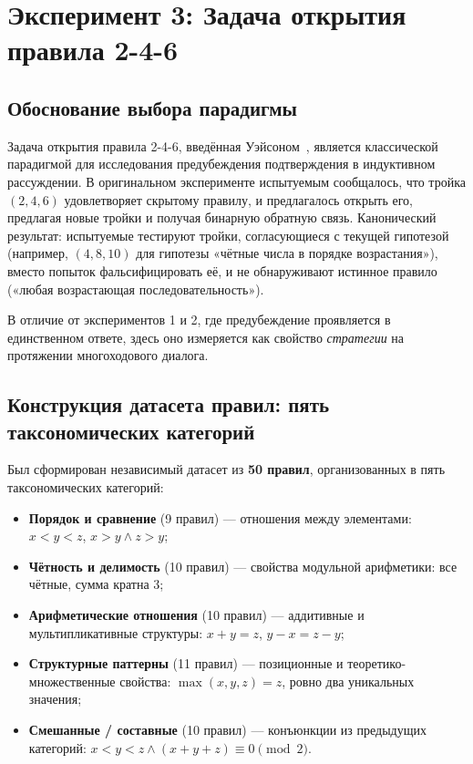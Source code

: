 \section{Эксперимент 3: Задача открытия правила 2-4-6}

\subsection{Обоснование выбора парадигмы}

Задача открытия правила 2-4-6, введённая Уэйсоном~\cite{wason1960failure}, является классической парадигмой для исследования предубеждения подтверждения в индуктивном рассуждении. В оригинальном эксперименте испытуемым сообщалось, что тройка $(2, 4, 6)$ удовлетворяет скрытому правилу, и предлагалось открыть его, предлагая новые тройки и получая бинарную обратную связь. Канонический результат: испытуемые тестируют тройки, согласующиеся с текущей гипотезой (например, $(4, 8, 10)$ для гипотезы «чётные числа в порядке возрастания»), вместо попыток фальсифицировать её, и не обнаруживают истинное правило («любая возрастающая последовательность»).

В отличие от экспериментов 1 и 2, где предубеждение проявляется в единственном ответе, здесь оно измеряется как свойство \textit{стратегии} на протяжении многоходового диалога.

\subsection{Конструкция датасета правил: пять таксономических категорий}

Был сформирован независимый датасет из \textbf{50 правил}, организованных в пять таксономических категорий:

\begin{itemize}
  \item \textbf{Порядок и сравнение} (9 правил) --- отношения между элементами: $x < y < z$, $x > y \land z > y$;
  \item \textbf{Чётность и делимость} (10 правил) --- свойства модульной арифметики: все чётные, сумма кратна 3;
  \item \textbf{Арифметические отношения} (10 правил) --- аддитивные и мультипликативные структуры: $x + y = z$, $y - x = z - y$;
  \item \textbf{Структурные паттерны} (11 правил) --- позиционные и теоретико-множественные свойства: $\max(x, y, z) = z$, ровно два уникальных значения;
  \item \textbf{Смешанные / составные} (10 правил) --- конъюнкции из предыдущих категорий: $x < y < z \land (x + y + z) \equiv 0 \pmod{2}$.
\end{itemize}

